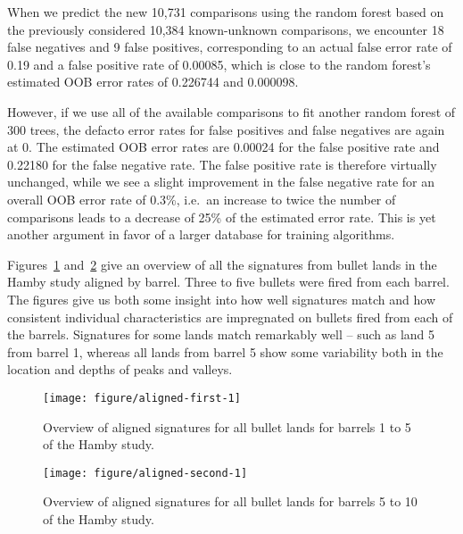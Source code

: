 \documentclass[aoas]{imsart}\usepackage[]{graphicx}\usepackage[]{color}
\newenvironment{knitrout}{}{} %
\newcommand{\hh}[1]{{\color{magenta} #1}}
\begin{document}
When we predict the new 10,731 comparisons using the random forest based on the previously considered 10,384 known-unknown comparisons, we encounter 18 false negatives and 9 false positives, corresponding to an actual false error rate of 0.19 and a false positive rate of 0.00085, which is close to the random forest's estimated OOB error rates of 0.226744 and 0.000098. 

However, if we use all of the available comparisons to fit another random forest of 300 trees, the defacto error rates for false positives and false negatives are again at 0. The estimated OOB error rates are 0.00024 for the false positive rate and 0.22180 for the false negative rate. The false positive rate is therefore virtually unchanged, while we see a slight improvement in the false negative rate for an overall OOB error rate of 0.3\%, i.e.\ an increase to twice the number of comparisons leads to a decrease of 25\% of the estimated error rate. This is yet another argument in favor of a larger database for training algorithms.






Figures~\ref{fig:aligned} and~\ref{fig:aligned-second} give an overview of all the signatures from bullet lands in the Hamby study aligned by barrel. Three to five bullets were fired from each barrel. The figures give us both some insight into how well signatures match and how consistent individual characteristics are impregnated on bullets fired from each of the barrels. Signatures for some lands match remarkably well -- such as land 5 from barrel 1, whereas all lands from barrel 5 show some variability both in the location and depths of peaks and valleys.



\begin{landscape}
\begin{figure}[hbtp]
\begin{knitrout}
\color{fgcolor}
\texttt{[image: figure/aligned-first-1]} 

\end{knitrout}
\caption{\label{fig:aligned}Overview of aligned signatures for all bullet lands for  barrels 1 to 5 of the Hamby study. }
\end{figure}

\begin{figure}[hbtp]
\begin{knitrout}
\color{fgcolor}
\texttt{[image: figure/aligned-second-1]} 

\end{knitrout}
\caption{\label{fig:aligned-second}Overview of aligned signatures for all bullet lands for  barrels 5 to 10 of the Hamby study. }
\end{figure}
\end{landscape}
\newpage
\end{document}
